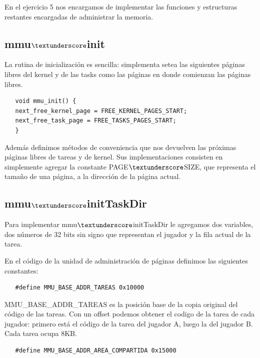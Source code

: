 \documentclass[a4paper]{article}
\newenvironment{codesnippet}{%
	\begin{Sbox}\begin{minipage}{\textwidth}\sffamily\small}%
	{\end{minipage}\end{Sbox}%
		\begin{center}%
		\vspace{-0.4cm}\colorbox{litegrey}{\TheSbox}\end{center}\vspace{0.3cm}}
\begin{document}
En el ejercicio 5 nos encargamos de implementar las funciones y estructuras restantes encargadas de administrar la
memoria.

\subsection{mmu$\textunderscore$init }
La rutina de inicialización es sencilla: simplementa setea las siguientes páginas libres del kernel y de las tasks como
las páginas en donde comienzan las páginas libres.

\begin{codesnippet}
  \begin{verbatim}
   void mmu_init() {
   next_free_kernel_page = FREE_KERNEL_PAGES_START;
   next_free_task_page = FREE_TASKS_PAGES_START;
   }
  \end{verbatim}
\end{codesnippet}
	
Además definimos métodos de conveniencia que nos devuelven las próximas páginas libres de tareas y de kernel. Sus
implementaciones consisten en simplemente agregar la constante PAGE$\textunderscore$SIZE, que representa el tamaño de
una página, a la dirección de la página actual.


\subsection{mmu$\textunderscore$initTaskDir}
Para implementar mmu$\textunderscore$initTaskDir le agregamos dos variables, dos números de 32 bits sin signo que
representan el jugador y la fila actual de la tarea.


En el código de la unidad de administración de páginas definimos las siguientes constantes:

\begin{codesnippet}
  \begin{verbatim}
   #define MMU_BASE_ADDR_TAREAS	0x10000
  \end{verbatim}
\end{codesnippet}

MMU\_BASE\_ADDR\_TAREAS es la posición base de la copia original del código de las tareas. Con un offset podemos obtener
el codigo de la tarea de cada jugador: primero está el código de la tarea del jugador A, luego la del jugador B. Cada
tarea ocupa 8KB.

\begin{codesnippet}
  \begin{verbatim}
   #define MMU_BASE_ADDR_AREA_COMPARTIDA 0x15000
  \end{verbatim}
\end{codesnippet}
\end{document}
